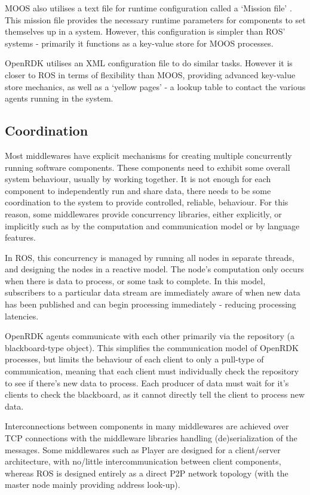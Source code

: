 \documentclass[../dissertation.tex]{subfiles}
\begin{document}
MOOS also utilises a text file for runtime configuration called a `Mission file' \cite{newman2009introduction}. This mission file provides the necessary runtime parameters for components to set themselves up in a system. However, this configuration is simpler than ROS' systems - primarily it functions as a key-value store for MOOS processes.

OpenRDK utilises an XML configuration file to do similar tasks. However it is closer to ROS in terms of flexibility than MOOS, providing advanced key-value store mechanics, as well as a `yellow pages' - a lookup table to contact the various agents running in the system.

\subsection{Coordination}

Most middlewares have explicit mechanisms for creating multiple concurrently running software components. These components need to exhibit some overall system behaviour, usually by working together. It is not enough for each component to independently run and share data, there needs to be some coordination to the system to provide controlled, reliable, behaviour. For this reason, some middlewares provide concurrency libraries, either explicitly, or implicitly such as by the computation and communication model or by language features.

In ROS, this concurrency is managed by running all nodes in separate threads, and designing the nodes in a reactive model. The node's computation only occurs when there is data to process, or some task to complete. In this model, subscribers to a particular data stream are immediately aware of when new data has been published and can begin processing immediately - reducing processing latencies.

OpenRDK agents communicate with each other primarily via the repository (a blackboard-type object). This simplifies the communication model of OpenRDK processes, but limits the behaviour of each client to only a pull-type of communication, meaning that each client must individually check the repository to see if there's new data to process. Each producer of data must wait for it's clients to check the blackboard, as it cannot directly tell the client to process new data.

Interconnections between components in many middlewares are achieved over TCP connections with the middleware libraries handling (de)serialization of the messages. Some middlewares such as Player are designed for a client/server architecture, with no/little intercommunication between client components, whereas ROS is designed entirely as a direct P2P network topology (with the master node mainly providing address look-up).
\end{document}
